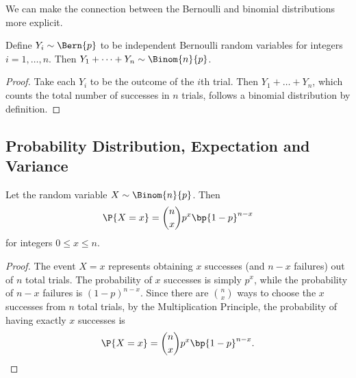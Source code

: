We can make the connection between the Bernoulli and binomial distributions more explicit.

\begin{proposition}\label{prop:drv-bin-bern}
    Define $Y_i \sim \Bern{p}$ to be independent Bernoulli random variables for integers $i = 1, \dots, n$. Then $Y_1 + \dots + Y_n \sim \Binom{n}{p}$.
\end{proposition}
\begin{proof}
    Take each $Y_i$ to be the outcome of the $i$th trial. Then $Y_1 + \dots + Y_n$, which counts the total number of successes in $n$ trials, follows a binomial distribution by definition.
\end{proof}

\subsection{Probability Distribution, Expectation and Variance}

\begin{proposition}
    Let the random variable $X \sim \Binom{n}{p}$. Then \[\P{X = x} = \binom{n}{x} p^x \bp{1 - p}^{n-x}\] for integers $0 \leq x \leq n$.
\end{proposition}
\begin{proof}
    The event $X = x$ represents obtaining $x$ successes (and $n-x$ failures) out of $n$ total trials. The probability of $x$ successes is simply $p^x$, while the probability of $n-x$ failures is $(1-p)^{n-x}$. Since there are $\binom{n}{x}$ ways to choose the $x$ successes from $n$ total trials, by the Multiplication Principle, the probability of having exactly $x$ successes is \[\P{X = x} = \binom{n}{x} p^x \bp{1 - p}^{n-x}.\]
\end{proof}

